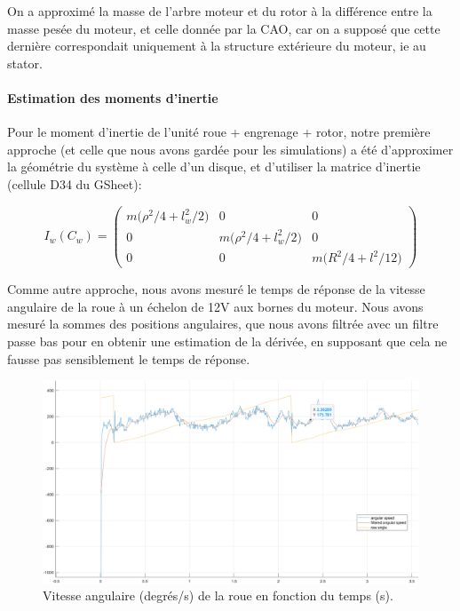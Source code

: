 \documentclass{report}
\begin{document}
On a approximé la masse de l'arbre moteur et du rotor à la différence
entre la masse pesée du moteur, et celle donnée par la CAO, car on a supposé que cette dernière 
correspondait uniquement à la structure extérieure du moteur, ie au stator.

\paragraph{Estimation des moments d'inertie}

Pour le moment d'inertie de l'unité roue + engrenage + rotor, 
notre première approche (et celle que nous avons gardée pour 
les simulations) a été d'approximer la géométrie du système à celle d'un disque,
et d'utiliser la matrice d'inertie (cellule D34 du GSheet):

\begin{equation*}
    I_w(C_w) = 
    \begin{pmatrix}
        m \big(\rho^2/4 + l_w^2/2 \big) & 0 & 0 \\
        0 & m \big(\rho^2/4 + l_w^2/2 \big) & 0 \\
        0 & 0 & m \big(R^2/4 + l^2/12 \big)
    \end{pmatrix}
\end{equation*}

Comme autre approche, nous avons mesuré le temps de réponse de la 
vitesse angulaire de la roue à un échelon de 12V aux bornes du moteur.
Nous avons mesuré la sommes des positions angulaires, que nous avons filtrée 
avec un filtre passe bas pour en obtenir une estimation de la 
dérivée, en supposant que cela ne fausse pas sensiblement le 
temps de réponse.

\begin{figure}[h]  %
    \centering
    \includegraphics[width=15cm]{figures/inertie_roue.png}
    \caption{Vitesse angulaire (degrés/s) de la roue en fonction du temps (s).}
\end{figure}
\end{document}
